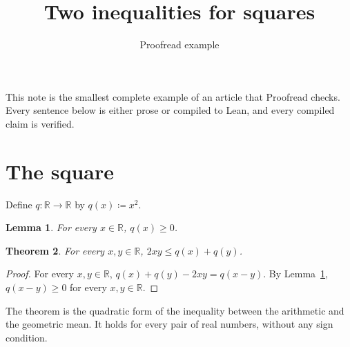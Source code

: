 \documentclass{article}
\title{Two inequalities for squares}
\author{Proofread example}
\newtheorem{lemma}{Lemma}
\newtheorem{theorem}[lemma]{Theorem}
\begin{document}
\maketitle

This note is the smallest complete example of an article that Proofread checks.
Every sentence below is either prose or compiled to Lean, and every compiled claim is verified.

\section{The square}

Define $q:\mathbb{R}\to\mathbb{R}$ by $q(x)\coloneqq x^2$.

\begin{lemma}\label{lem:nonneg}
For every $x\in\mathbb{R}$, $q(x)\ge0$.
\end{lemma}

\begin{theorem}\label{thm:amgm}
For every $x,y\in\mathbb{R}$, $2xy\le q(x)+q(y)$.
\end{theorem}

\begin{proof}
For every $x,y\in\mathbb{R}$, $q(x)+q(y)-2xy=q(x-y)$.
By Lemma~\ref{lem:nonneg}, $q(x-y)\ge0$ for every $x,y\in\mathbb{R}$.
\end{proof}

The theorem is the quadratic form of the inequality between the arithmetic and the geometric mean.
It holds for every pair of real numbers, without any sign condition.
\end{document}
